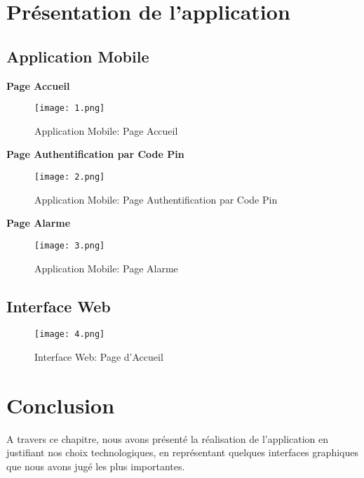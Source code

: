 \begin{spacing}{1.2}
\newpage
\section{Présentation de l'application}
\subsection{Application Mobile}

\textbf{Page Accueil}
\begin{figure}[H]\centering
\texttt{[image: 1.png]}
\caption{Application Mobile: Page Accueil}
\label{fig:fig3}
\end{figure} 

\textbf{Page Authentification par Code Pin}
\begin{figure}[H]\centering
\texttt{[image: 2.png]}
\caption{Application Mobile: Page Authentification par Code Pin}
\label{fig:fig3}
\end{figure} 

\textbf{Page Alarme}
\begin{figure}[H]\centering
\texttt{[image: 3.png]}
\caption{Application Mobile: Page Alarme}
\label{fig:fig3}
\end{figure} 

\subsection{Interface Web}

\begin{figure}[H]\centering
\texttt{[image: 4.png]}
\caption{Interface Web: Page d'Accueil}
\label{fig:fig3}
\end{figure} 


\section*{Conclusion}
A travers ce chapitre, nous avons présenté la réalisation de l’application en justifiant nos choix technologiques, en représentant quelques interfaces graphiques que nous avons jugé les plus importantes.

\end{spacing}
